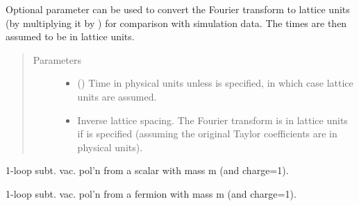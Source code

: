 \documentclass[letterpaper,10pt,english]{sphinxmanual}
\begin{document}
\begin{fulllineitems}
\begin{fulllineitems}
Optional parameter  can be used to convert the Fourier
transform to lattice units (by multiplying it by ) for
comparison with simulation data. The times  are then
assumed to be in lattice units.
\begin{quote}\begin{description}
\item[{Parameters}] \leavevmode\begin{itemize}
\item {} 
 (\sphinxstyleliteralemphasis{\sphinxupquote{, }}) \textendash{} Time in physical units unless 
is specified, in which case lattice units are assumed.

\item {} 
 \textendash{} Inverse lattice spacing. The Fourier transform is in lattice
units if  is specified (assuming the original
Taylor coefficients are in physical units).

\end{itemize}

\end{description}\end{quote}

\end{fulllineitems}


\begin{fulllineitems}
\label{\detokenize{g2tools:g2tools.vacpol.scalar}}
1-loop subt. vac. pol’n from a scalar with mass m (and charge=1).

\end{fulllineitems}


\begin{fulllineitems}
\label{\detokenize{g2tools:g2tools.vacpol.fermion}}
1-loop subt. vac. pol’n from a fermion with mass m (and charge=1).


\end{fulllineitems}
\end{fulllineitems}
\end{document}

